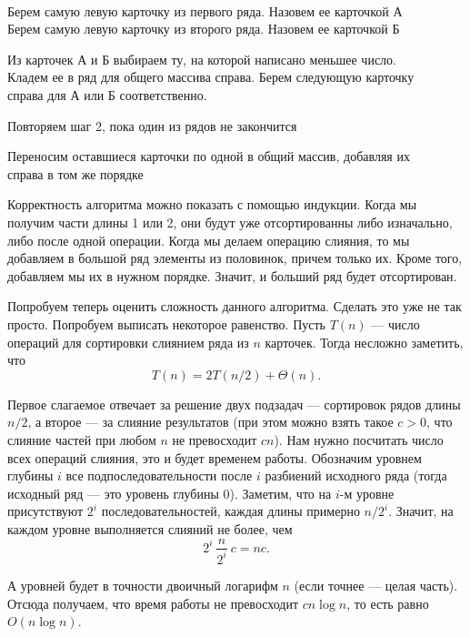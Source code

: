 \begin{enumerate}
    {\tt
    \item Берем самую левую карточку из первого ряда. Назовем ее карточкой А \\
        Берем самую левую карточку из второго ряда. Назовем ее карточкой Б
    \item Из карточек А и Б выбираем ту, на которой написано меньшее число. \\
        Кладем ее в ряд для общего массива справа. Берем следующую карточку \\
        справа для А или Б соответственно.
    \item Повторяем шаг 2, пока один из рядов не закончится
    \item Переносим оставшиеся карточки по одной в общий массив, добавляя их \\
        справа в том же порядке
    }
\end{enumerate}

Корректность алгоритма можно показать с помощью индукции. Когда мы получим части
длины 1 или 2, они будут уже отсортированны либо изначально, либо после одной
операции. Когда мы делаем операцию слияния, то мы добавляем в большой ряд
элементы из половинок, причем только их. Кроме того, добавляем мы их в нужном
порядке. Значит, и больший ряд будет отсортирован.

Попробуем теперь оценить сложность данного алгоритма. Сделать это уже не так
просто. Попробуем выписать некоторое равенство. Пусть $T(n)$ --- число
операций для сортировки слиянием ряда из $n$ карточек. Тогда несложно
заметить, что
\[
    T(n) = 2T(n/2) + \Theta(n).
    \]

Первое слагаемое отвечает за решение двух подзадач --- сортировок рядов длины
$n/2$, а второе --- за слияние результатов (при этом можно взять такое $c > 0$,
что слияние частей при любом $n$ не превосходит $cn$). Нам нужно посчитать число 
всех операций слияния, это и будет временем работы. Обозначим уровнем глубины $i$
все подпоследовательности после $i$ разбиений исходного ряда (тогда исходный
ряд --- это уровень глубины 0). Заметим, что на $i$-м уровне присутствуют
$2^i$ последовательностей, каждая длины примерно $n/2^i$. Значит, на каждом
уровне выполняется слияний не более, чем 
\[
    2^i\ \frac{n}{2^i}\ c = nc.
    \]

А уровней будет в точности двоичный логарифм $n$ (если точнее --- целая часть).
Отсюда получаем, что время работы не превосходит $cn \log n$, то есть равно
$O(n \log n)$.

